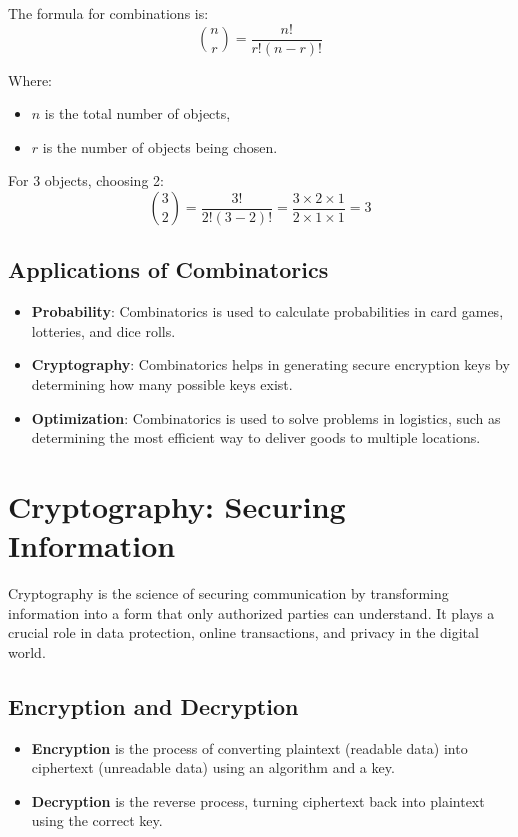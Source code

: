 The formula for combinations is:
\[ \binom{n}{r} = \frac{n!}{r!(n-r)!} \]

Where:
\begin{itemize}
    \item \( n \) is the total number of objects,
    \item \( r \) is the number of objects being chosen.
\end{itemize}

For 3 objects, choosing 2:
\[ \binom{3}{2} = \frac{3!}{2!(3-2)!} = \frac{3 \times 2 \times 1}{2 \times 1 \times 1} = 3 \]

\subsection{Applications of Combinatorics}
\begin{itemize}
    \item \textbf{Probability}: Combinatorics is used to calculate probabilities in card games, lotteries, and dice rolls.
    \item \textbf{Cryptography}: Combinatorics helps in generating secure encryption keys by determining how many possible keys exist.
    \item \textbf{Optimization}: Combinatorics is used to solve problems in logistics, such as determining the most efficient way to deliver goods to multiple locations.
\end{itemize}

\section{Cryptography: Securing Information}
Cryptography is the science of securing communication by transforming information into a form that only authorized parties can understand. It plays a crucial role in data protection, online transactions, and privacy in the digital world.

\subsection{Encryption and Decryption}
\begin{itemize}
    \item \textbf{Encryption} is the process of converting plaintext (readable data) into ciphertext (unreadable data) using an algorithm and a key.
    \item \textbf{Decryption} is the reverse process, turning ciphertext back into plaintext using the correct key.
\end{itemize}

